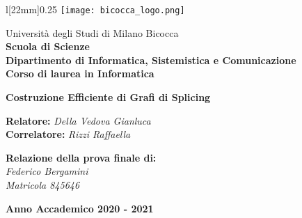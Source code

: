 \begin{titlepage}
\begin{onehalfspace}
	\begin{wrapfigure}[4]{l}[22mm]{0.25\textwidth}
		\vspace*{-7mm}
		\centering
		\texttt{[image: bicocca\_logo.png]}
	\end{wrapfigure}
	\par
	\noindent Università degli Studi di Milano Bicocca \\
	\textbf{Scuola di Scienze \\
			Dipartimento di Informatica, Sistemistica e Comunicazione \\
			Corso di laurea in Informatica}
\end{onehalfspace}

\vfill
\par

\begin{doublespace}
\begin{center}
	{\Huge \textbf{Costruzione Efficiente di Grafi di Splicing}}
\end{center}
\end{doublespace}

\vfill
\par

\begin{onehalfspace}
\begin{flushleft}
	{
	    \large \textbf{Relatore:} \textit{Della Vedova Gianluca} \\
	    \large \textbf{Correlatore:} \textit{Rizzi Raffaella}
	}
\end{flushleft}

\vspace{8mm}
\par

\begin{flushright}
	{\large \textbf{Relazione della prova finale di:} \\
			\textit{Federico Bergamini} \\
			\textit{Matricola 845646}}
\end{flushright}
\end{onehalfspace}

\vfill
\par

\begin{center}
	{\large \textbf{Anno Accademico 2020 - 2021}}
\end{center}

\end{titlepage}